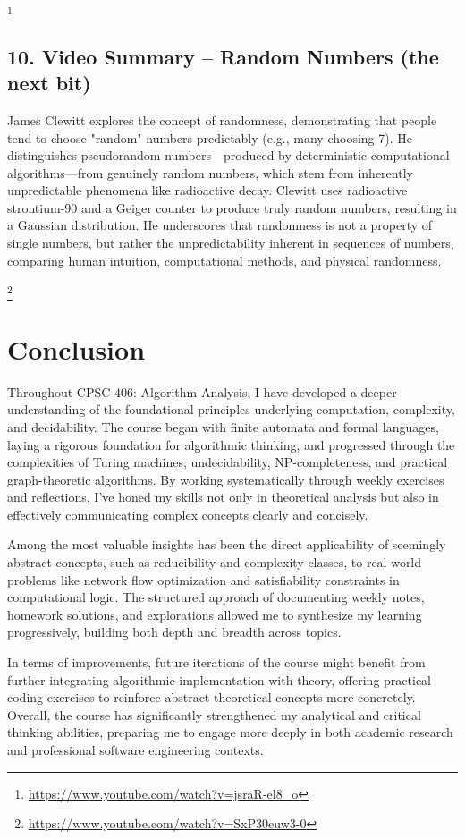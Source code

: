 \documentclass{article}
\theoremstyle{theorem}
\theoremstyle{definition}
\theoremstyle{remark}
\begin{document}
\footnote{\url{https://www.youtube.com/watch?v=jsraR-el8_o}}

\subsection*{10. Video Summary – Random Numbers (the next bit)}

James Clewitt explores the concept of randomness, demonstrating that people tend to choose "random" numbers predictably (e.g., many choosing 7). He distinguishes pseudorandom numbers—produced by deterministic computational algorithms—from genuinely random numbers, which stem from inherently unpredictable phenomena like radioactive decay. Clewitt uses radioactive strontium-90 and a Geiger counter to produce truly random numbers, resulting in a Gaussian distribution. He underscores that randomness is not a property of single numbers, but rather the unpredictability inherent in sequences of numbers, comparing human intuition, computational methods, and physical randomness.

\footnote{\url{https://www.youtube.com/watch?v=SxP30euw3-0}}


\section{Conclusion}\label{conclusion}

Throughout CPSC-406: Algorithm Analysis, I have developed a deeper understanding of the foundational principles underlying computation, complexity, and decidability. The course began with finite automata and formal languages, laying a rigorous foundation for algorithmic thinking, and progressed through the complexities of Turing machines, undecidability, NP-completeness, and practical graph-theoretic algorithms. By working systematically through weekly exercises and reflections, I've honed my skills not only in theoretical analysis but also in effectively communicating complex concepts clearly and concisely.

Among the most valuable insights has been the direct applicability of seemingly abstract concepts, such as reducibility and complexity classes, to real-world problems like network flow optimization and satisfiability constraints in computational logic. The structured approach of documenting weekly notes, homework solutions, and explorations allowed me to synthesize my learning progressively, building both depth and breadth across topics.

In terms of improvements, future iterations of the course might benefit from further integrating algorithmic implementation with theory, offering practical coding exercises to reinforce abstract theoretical concepts more concretely. Overall, the course has significantly strengthened my analytical and critical thinking abilities, preparing me to engage more deeply in both academic research and professional software engineering contexts.
\end{document}
